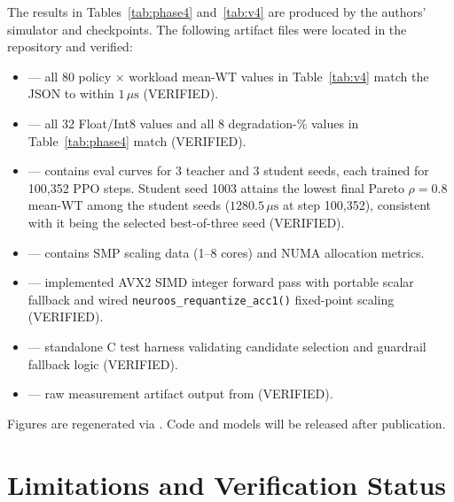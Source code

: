 \begingroup\raggedright
The results in Tables~\ref{tab:phase4} and~\ref{tab:v4} are produced by the
authors' simulator and checkpoints. The following artifact files were located
in the repository and verified:
\begin{itemize}
  \item {} --- all 80 policy $\times$
    workload mean-WT values in Table~\ref{tab:v4} match the JSON to within
    $1\,\mu\text{s}$ (VERIFIED).
  \item {} --- all 32 Float/Int8
    values and all 8 degradation-\% values in Table~\ref{tab:phase4} match
    (VERIFIED).
  \item {} --- contains eval curves
    for 3 teacher and 3 student seeds, each trained for 100{,}352 PPO steps. Student
    seed 1003 attains the lowest final Pareto $\rho=0.8$ mean-WT among the student
    seeds ($1280.5\,\mu\text{s}$ at step 100{,}352), consistent with it being the
    selected best-of-three seed (VERIFIED).
  \item {} --- contains SMP scaling data (1--8
    cores) and NUMA allocation metrics.
  \item {} --- implemented AVX2 SIMD integer forward pass with portable scalar fallback and wired \texttt{neuroos\_requantize\_acc1()} fixed-point scaling (VERIFIED).
  \item {} --- standalone C test harness validating candidate selection and guardrail fallback logic (VERIFIED).
  \item {} --- raw measurement artifact output from  (VERIFIED).
\end{itemize}
Figures are regenerated via .
Code and models will be released after publication.
\par\endgroup

\section{Limitations and Verification Status}
\label{sec:limits}

